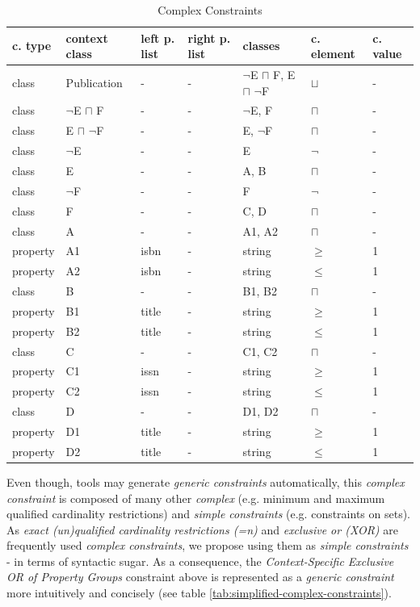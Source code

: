 \documentclass{llncs}
\begin{document}
\begin{table}
  \scriptsize
  \sffamily
  \vspace{0cm}
	\centering
		\begin{tabular}{l|l|l|l|l|l|l}
      \textbf{c. type} & \textbf{context class} & \textbf{left p. list} & \textbf{right p. list} & \textbf{classes} & \textbf{c. element} & \textbf{c. value} \\
      \hline
class & Publication & - & - & $\neg$E $\sqcap$ F, E $\sqcap$ $\neg$F & $\sqcup$ & - \\
class & $\neg$E $\sqcap$ F & - & - & $\neg$E, F & $\sqcap$ & - \\
class & E $\sqcap$ $\neg$F & - & - & E, $\neg$F & $\sqcap$ & - \\
class & $\neg$E & - & - & E & $\neg$ & - \\
class & E & - & - & A, B & $\sqcap$ & - \\
class & $\neg$F & - & - & F & $\neg$ & - \\
class & F & - & - & C, D & $\sqcap$ & - \\
class & A & - & - & A1, A2 & $\sqcap$ & - \\
property & A1 & isbn & - & string & $\geq$ & 1 \\
property & A2 & isbn & - & string & $\leq$ & 1 \\
class & B & - & - & B1, B2 & $\sqcap$ & - \\
property & B1 & title & - & string & $\geq$ & 1 \\
property & B2 & title & - & string & $\leq$ & 1 \\
class & C & - & - & C1, C2 & $\sqcap$ & - \\
property & C1 & issn & - & string & $\geq$ & 1 \\
property & C2 & issn & - & string & $\leq$ & 1 \\
class & D & - & - & D1, D2 & $\sqcap$ & - \\
property & D1 & title & - & string & $\geq$ & 1 \\
property & D2 & title & - & string & $\leq$ & 1 \\
		\end{tabular}
	\caption{Complex Constraints}
	\label{tab:complex-constraints}
\end{table}

Even though, tools may generate \emph{generic constraints} automatically, this \emph{complex constraint} is composed of many other \emph{complex} (e.g. minimum and maximum qualified cardinality restrictions) and \emph{simple constraints} (e.g. constraints on sets).
As \emph{exact (un)qualified cardinality restrictions (=n)} and \emph{exclusive or (XOR)} are frequently used \emph{complex constraints},
we propose using them as \emph{simple constraints} - in terms of syntactic sugar.
As a consequence, the \emph{Context-Specific Exclusive OR of Property Groups} constraint above is represented as a \emph{generic constraint} more intuitively and concisely (see table \ref{tab:simplified-complex-constraints}).
\end{document}
